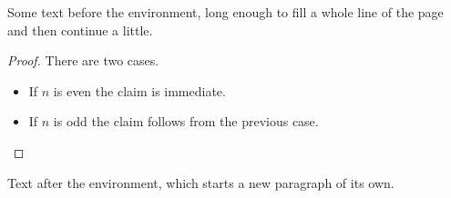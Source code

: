 \documentclass{article}
\begin{document}
Some text before the environment, long enough to fill a whole line of the page and then continue a little.
\begin{proof}
There are two cases.
\begin{itemize}
\item If $n$ is even the claim is immediate.
\item If $n$ is odd the claim follows from the previous case. \qedhere
\end{itemize}
\end{proof}
Text after the environment, which starts a new paragraph of its own.
\end{document}
